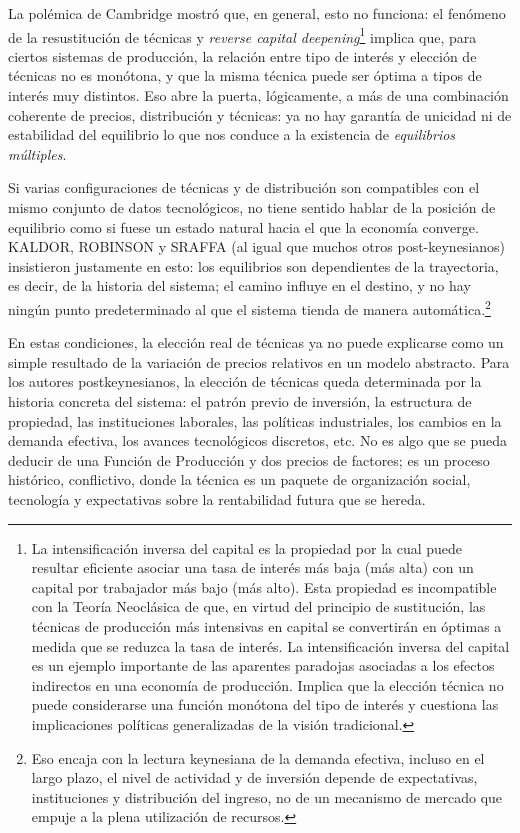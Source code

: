 \documentclass[10pt,a4paper]{article}
\begin{document}
La polémica de Cambridge mostró que, en general, esto no funciona: el fenómeno de la resustitución de técnicas y \textit{reverse capital deepening}\footnote{%
    La intensificación inversa del capital es la propiedad por la cual puede resultar eficiente asociar una tasa de interés más baja (más alta) con un capital por trabajador más bajo (más alto). Esta propiedad es incompatible con la Teoría Neoclásica de que, en virtud del principio de sustitución, las técnicas de producción más intensivas en capital se convertirán en óptimas a medida que se reduzca la tasa de interés. La intensificación inversa del capital es un ejemplo importante de las aparentes paradojas asociadas a los efectos indirectos en una economía de producción. Implica que la elección técnica no puede considerarse una función monótona del tipo de interés y cuestiona las implicaciones políticas generalizadas de la visión tradicional.
} implica que, para ciertos sistemas de producción, la relación entre tipo de interés y elección de técnicas no es monótona, y que la misma técnica puede ser óptima a tipos de interés muy distintos. Eso abre la puerta, lógicamente, a más de una combinación coherente de precios, distribución y técnicas: ya no hay garantía de unicidad ni de estabilidad del equilibrio lo que nos conduce a la existencia de \textit{equilibrios múltiples}.

Si varias configuraciones de técnicas y de distribución son compatibles con el mismo conjunto de datos tecnológicos, no tiene sentido hablar de la posición de equilibrio como si fuese un estado natural hacia el que la economía converge. KALDOR, ROBINSON y SRAFFA (al igual que muchos otros post-keynesianos) insistieron justamente en esto: los equilibrios son dependientes de la trayectoria, es decir, de la historia del sistema; el camino influye en el destino, y no hay ningún punto predeterminado al que el sistema tienda de manera automática.\footnote{%
    Eso encaja con la lectura keynesiana de la demanda efectiva, incluso en el largo plazo, el nivel de actividad y de inversión depende de expectativas, instituciones y distribución del ingreso, no de un mecanismo de mercado que empuje a la plena utilización de recursos.
}

En estas condiciones, la elección real de técnicas ya no puede explicarse como un simple resultado de la variación de precios relativos en un modelo abstracto. Para los autores postkeynesianos, la elección de técnicas queda determinada por la historia concreta del sistema: el patrón previo de inversión, la estructura de propiedad, las instituciones laborales, las políticas industriales, los cambios en la demanda efectiva, los avances tecnológicos discretos, etc. No es algo que se pueda deducir de una Función de Producción y dos precios de factores; es un proceso histórico, conflictivo, donde la técnica es un paquete de organización social, tecnología y expectativas sobre la rentabilidad futura que se hereda. 
\end{document}
